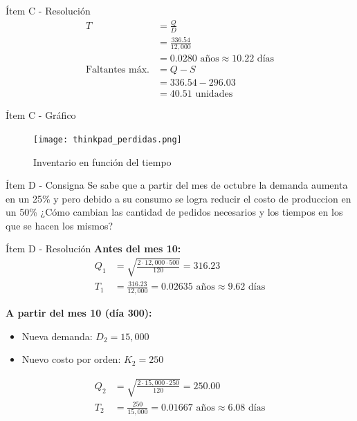 \documentclass{beamer}
\begin{document}
\begin{frame}{Ítem C - Resolución}
\begin{align*}
T &= \frac{Q}{D} \\
  &= \frac{336.54}{12{,}000} \\
  &= 0.0280 \text{ años} \approx 10.22 \text{ días} \\[1em]
\text{Faltantes máx.} &= Q - S \\
  &= 336.54 - 296.03 \\
  &= 40.51 \text{ unidades}
\end{align*}
\end{frame}

\begin{frame}{Ítem C - Gráfico}
\begin{figure}
    \centering
    \texttt{[image: thinkpad\_perdidas.png]}
    \caption{Inventario en función del tiempo}
\end{figure}
\end{frame}

\begin{frame}{Ítem D - Consigna}
    Se sabe que a partir del mes de octubre la demanda aumenta en un 25\% y pero debido a su consumo se logra reducir el costo de produccion en un 50\% ¿Cómo cambian las cantidad de pedidos necesarios y los tiempos en los que se hacen los mismos?
\end{frame}


\begin{frame}{Ítem D - Resolución}
    \textbf{Antes del mes 10:}
    \begin{align*}
    Q_1 &= \sqrt{\frac{2 \cdot 12{,}000 \cdot 500}{120}} = 316.23 \\
    T_1 &= \frac{316.23}{12{,}000} = 0.02635 \text{ años} \approx 9.62 \text{ días}
    \end{align*}

    \vspace{1em}
    \textbf{A partir del mes 10 (día 300):}
    \begin{itemize}
        \item Nueva demanda: $D_2 = 15{,}000$
        \item Nuevo costo por orden: $K_2 = 250$
    \end{itemize}
    \begin{align*}
    Q_2 &= \sqrt{\frac{2 \cdot 15{,}000 \cdot 250}{120}} = 250.00 \\
    T_2 &= \frac{250}{15{,}000} = 0.01667 \text{ años} \approx 6.08 \text{ días}
    \end{align*}
\end{frame}
\end{document}
